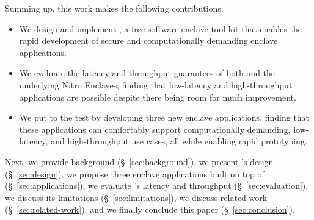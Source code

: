 Summing up, this work makes the following contributions:

\begin{itemize}

  \item We design and implement \emph{\tool{}}, a free software enclave tool kit
    that enables the rapid development of secure and computationally demanding
    enclave applications.

  \item We evaluate the latency and throughput guarantees of both \tool{} and
    the underlying Nitro Enclaves, finding that low-latency and high-throughput
    applications are possible despite there being room for much improvement.

  \item We put \tool{} to the test by developing three new enclave applications,
    finding that these applications can comfortably support computationally
    demanding, low-latency, and high-throughput use cases, all while enabling
    rapid prototyping.

\end{itemize}

Next, we provide background (\S~\ref{sec:background}), we present \tool{}'s design
(\S~\ref{sec:design}), we propose three enclave applications built on top of
\tool{} (\S~\ref{sec:applications}), we evaluate \tool{}'s latency and
throughput (\S~\ref{sec:evaluation}), we discuss its limitations
(\S~\ref{sec:limitations}), we discuss related work (\S~\ref{sec:related-work}),
and we finally conclude this paper (\S~\ref{sec:conclusion}).
